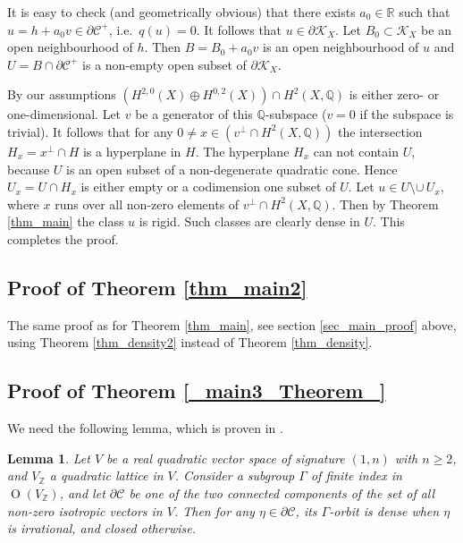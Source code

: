 \documentclass[11pt]{article}
\newcommand{\6}{\partial}
\newcommand{\Z}{\mathbb{Z}}
\newcommand{\bbQ}{\mathbb{Q}}
\newcommand{\bbR}{\mathbb{R}}
\newcommand{\CC}{\mathcal{C}}
\newcommand{\KK}{\mathcal{K}}
\newcommand{\rmO}{\operatorname{O}}
\newtheorem{lem}[defn]{Lemma}
\begin{document}
It is easy to check (and geometrically obvious) that there exists $a_0\in \bbR$ such that $u = h+a_0v\in \partial \CC^+$,
i.e.\ $q(u)=0$. It follows that $u\in \partial \KK_X$. Let $B_0\subset \KK_X$ be an open
neighbourhood of $h$. Then $B = B_0 + a_0 v$ is an open neighbourhood of $u$
and $U = B\cap \partial\CC^+$ is a non-empty open subset of $\partial\KK_X$.

By our assumptions $(H^{2,0}(X)\oplus H^{0,2}(X)) \cap H^2(X,\bbQ)$ is either zero- or one-dimensional.
Let $v$ be a generator of this $\bbQ$-subspace ($v=0$ if the subspace is trivial). 
It follows that for any $0\neq x\in (v^\perp\cap H^2(X,\bbQ))$ the intersection $H_x = x^\perp\cap H$
is a hyperplane in $H$. The hyperplane $H_x$ can not contain $U$, because $U$ is an
open subset of a non-degenerate quadratic cone. Hence $U_x = U\cap H_x$ is either empty or a
codimension one subset of $U$. Let $u\in U\setminus \cup\, U_x$, where
$x$ runs over all non-zero elements of $v^\perp\cap H^2(X,\bbQ)$. Then by Theorem \ref{thm_main}
the class $u$ is rigid. Such classes are clearly dense in $U$. This completes the proof.

\subsection{Proof of Theorem \ref{thm_main2}}\label{sec_main2_proof}

The same proof as for Theorem \ref{thm_main}, see section \ref{sec_main_proof} above,
using Theorem \ref{thm_density2} instead of Theorem \ref{thm_density}.

\subsection{Proof of Theorem \ref{_main3_Theorem_}}\label{sec_main3_proof}

We need the following lemma, which is proven in
\cite{_Filip_Tosatti:canonical_}.

\begin{lem}\label{_dichotomy_Lemma_}
Let  $V$ be a real quadratic vector space
of signature $(1,n)$ with $n \geq 2$, and $V_\Z$ a 
quadratic lattice in $V$. Consider a subgroup
$\Gamma$ of finite index in $\rmO(V_\Z)$,
and let $\6\CC$ be one of the two connected components of
the set of all non-zero isotropic vectors in $V$.
Then for any $\eta\in \6\CC$,
its $\Gamma$-orbit is dense when $\eta$ is irrational,
and closed otherwise.
\end{lem}
\end{document}
